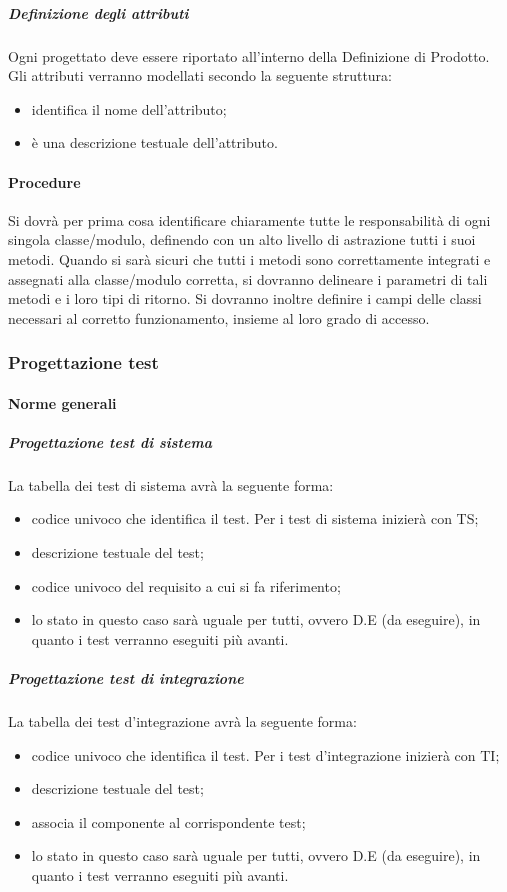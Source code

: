 \subparagraph{Definizione degli attributi}
Ogni  progettato deve essere riportato all'interno della Definizione di Prodotto. Gli attributi verranno modellati secondo la seguente struttura:
\begin{itemize}
\item {}identifica il nome dell'attributo;
\item {}è una descrizione testuale dell'attributo.
\end{itemize}


\paragraph{Procedure}
Si dovrà per prima cosa identificare chiaramente tutte le responsabilità di ogni singola classe/modulo, definendo con un alto livello di astrazione tutti i suoi metodi.
Quando si sarà sicuri che tutti i metodi sono correttamente integrati e assegnati alla classe/modulo corretta, si dovranno delineare i parametri di tali metodi e i loro tipi di ritorno.
Si dovranno inoltre definire i campi delle classi necessari al corretto funzionamento, insieme al loro grado di accesso.

\subsubsection{Progettazione test}
\label{prog_test}
\paragraph{Norme generali}
\subparagraph{Progettazione test di sistema}
La tabella dei test di sistema avrà la seguente forma:
\begin{itemize}
\item {}codice univoco che identifica il test. Per i test di sistema inizierà con TS;
\item {} descrizione testuale del test;
\item {}codice univoco del requisito a cui si fa riferimento;
\item {}lo stato in questo caso sarà uguale per tutti, ovvero D.E (da eseguire), in quanto i test verranno eseguiti più avanti.
\end{itemize}


\subparagraph{Progettazione test di integrazione}
La tabella dei test d'integrazione avrà la seguente forma:
\begin{itemize}
\item {}codice univoco che identifica il test. Per i test d'integrazione inizierà con TI;
\item {} descrizione testuale del test;
\item {} associa il componente al corrispondente test;
\item {}lo stato in questo caso sarà uguale per tutti, ovvero D.E (da eseguire), in quanto i test verranno eseguiti più avanti.
\end{itemize}

